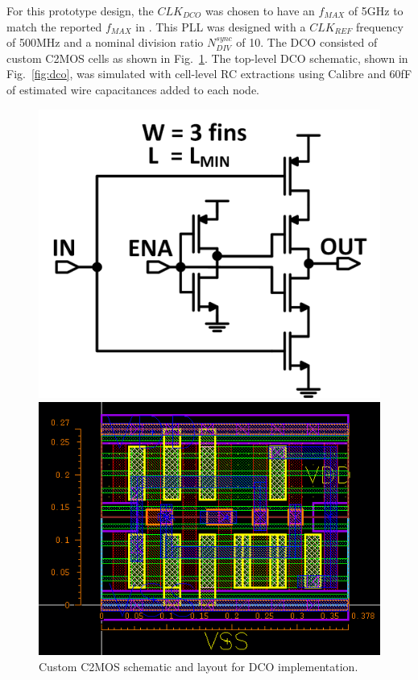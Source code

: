 \documentclass[twoside,9pt,journal,letterpage]{IEEEtran}
\begin{document}
For this prototype design, the $CLK_{DCO}$ was chosen to have an $f_{MAX}$ of 5GHz to match the reported $f_{MAX}$ in \cite{hashimoto2018}. This PLL was designed with a $CLK_{REF}$ frequency of 500MHz and a nominal division ratio $N_{DIV}^{sync}$ of 10. The DCO consisted of custom C2MOS cells as shown in Fig.\ \ref{fig:c2mos}. The top-level DCO schematic, shown in Fig.\ \ref{fig:dco}, was simulated with cell-level RC extractions using Calibre and 60fF of estimated wire capacitances added to each node.

\begin{figure}[h]
	\centering
	\begin{minipage}{0.49\columnwidth}
	\includegraphics[width=\textwidth]{fig_c2mossch}
	\end{minipage}
	\hfill
	\begin{minipage}{0.49\columnwidth}
	\includegraphics[width=\textwidth]{fig_c2moslayout}
	\end{minipage}
	\caption{Custom C2MOS schematic and layout for DCO implementation.}
	\label{fig:c2mos}
\end{figure}
\end{document}
